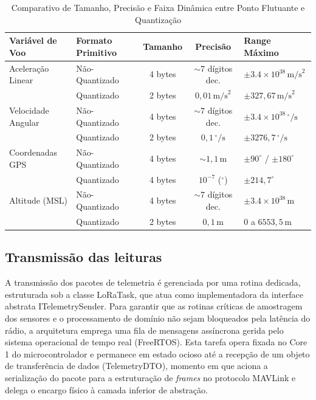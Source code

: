 \begin{table}[h]
\centering
\caption{Comparativo de Tamanho, Precisão e Faixa Dinâmica entre Ponto Flutuante e Quantização}
\label{tab:comparativo_quantizacao}
  \begin{tabular}{llccl}
    \hline
    \textbf{Variável de Voo} & \textbf{Formato Primitivo} & \textbf{Tamanho} & \textbf{Precisão} & \textbf{Range Máximo} \\ \hline
    Aceleração Linear & Não-Quantizado & 4 bytes & $\sim 7$ dígitos dec. & $\pm 3.4 \times 10^{38} \, \text{m/s}^2$ \\
    & Quantizado & 2 bytes & $0,01 \, \text{m/s}^2$ & $\pm 327,67 \, \text{m/s}^2$ \\ \hline
    Velocidade Angular & Não-Quantizado & 4 bytes & $\sim 7$ dígitos dec. & $\pm 3.4 \times 10^{38} \, ^\circ\text{/s}$ \\
    & Quantizado & 2 bytes & $0,1 \, ^\circ\text{/s}$ & $\pm 3276,7 \, ^\circ\text{/s}$ \\ \hline
    Coordenadas GPS & Não-Quantizado & 4 bytes & $\sim 1,1 \, \text{m}$ & $\pm 90^\circ$ / $\pm 180^\circ$ \\
    & Quantizado & 4 bytes & $10^{-7}$ ($^\circ$) & $\pm 214,7^\circ$ \\ \hline
    Altitude (MSL) & Não-Quantizado & 4 bytes & $\sim 7$ dígitos dec. & $\pm 3.4 \times 10^{38} \, \text{m}$ \\
    & Quantizado & 2 bytes & $0,1 \, \text{m}$ & $0$ a $6553,5 \, \text{m}$ \\ \hline
  \end{tabular}
\end{table}

\subsection{Transmissão das leituras}
A transmissão dos pacotes de telemetria é gerenciada por uma rotina dedicada, estruturada sob a classe LoRaTask, que atua como implementadora da interface abstrata ITelemetrySender. Para garantir que as rotinas críticas de amostragem dos sensores e o processamento de domínio não sejam bloqueados pela latência do rádio, a arquitetura emprega uma fila de mensagens assíncrona gerida pelo sistema operacional de tempo real (FreeRTOS). Esta tarefa opera fixada no Core 1 do microcontrolador e permanece em estado ocioso até a recepção de um objeto de transferência de dados (TelemetryDTO), momento em que aciona a serialização do pacote para a estruturação de \textit{frames} no protocolo MAVLink e delega o encargo físico à camada inferior de abstração.

